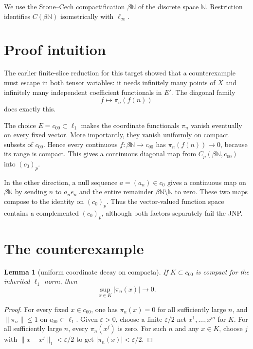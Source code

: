 \documentclass[11pt]{article}
\newtheorem{lemma}{Lemma}
\newcommand{\N}{\mathbb N}
\newcommand{\czerop}{(c_0)_p}
\begin{document}
We use the Stone--Cech compactification $\beta\N$ of the discrete space
$\N$.  Restriction identifies $C(\beta\N)$ isometrically with $\ell_\infty$.

\section{Proof intuition}

The earlier finite-slice reduction for this target showed that a
counterexample must escape in both tensor variables: it needs infinitely many
points of $X$ and infinitely many independent coefficient functionals in
$E'$.  The diagonal family
\[
  f\longmapsto \pi_n(f(n))
\]
does exactly this.

The choice $E=c_{00}\subset\ell_1$ makes the coordinate functionals
$\pi_n$ vanish eventually on every fixed vector.  More importantly, they
vanish uniformly on compact subsets of $c_{00}$.  Hence every continuous
$f:\beta\N\to c_{00}$ has
$\pi_n(f(n))\to0$, because its range is compact.  This gives a continuous
diagonal map from $C_p(\beta\N,c_{00})$ into $\czerop$.

In the other direction, a null sequence $a=(a_n)\in c_0$ gives a continuous
map on $\beta\N$ by sending $n$ to $a_ne_n$ and the entire remainder
$\beta\N\setminus\N$ to zero.  These two maps compose to the identity on
$\czerop$.  Thus the vector-valued function space contains a complemented
$\czerop$, although both factors separately fail the JNP.

\section{The counterexample}

\begin{lemma}[uniform coordinate decay on compacta]\label{lem:compact}
If $K\subset c_{00}$ is compact for the inherited $\ell_1$ norm, then
\[
  \sup_{x\in K}|\pi_n(x)|\longrightarrow0.
\]
\end{lemma}

\begin{proof}
For every fixed $x\in c_{00}$, one has $\pi_n(x)=0$ for all sufficiently
large $n$, and $\|\pi_n\|\leq1$ on $c_{00}\subset\ell_1$.  Given
$\varepsilon>0$, choose a finite $\varepsilon/2$-net
$x^1,\dots,x^m$ for $K$.  For all sufficiently large $n$, every
$\pi_n(x^j)$ is zero.  For such $n$ and any $x\in K$, choose $j$ with
$\|x-x^j\|_1<\varepsilon/2$ to get
$|\pi_n(x)|<\varepsilon/2$.
\end{proof}
\end{document}
